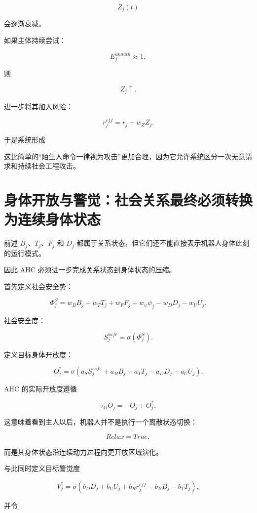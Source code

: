 \[
Z_j(t)
\]

会逐渐衰减。

如果主体持续尝试：

\[
E_j^{unauth}\approx1,
\]

则

\[
Z_j\uparrow.
\]

进一步将其加入风险：

\[
r_j^{eff}
=
r_j
+
w_ZZ_j.
\]

于是系统形成

\begin{statementbox}
\centering
{}
\end{statementbox}

这比简单的“陌生人命令一律视为攻击”更加合理，因为它允许系统区分一次无意请求和持续社会工程攻击。


\section{身体开放与警觉：社会关系最终必须转换为连续身体状态}

前述 $B_j$、$T_j$、$F_j$ 和 $D_j$ 都属于关系状态，但它们还不能直接表示机器人身体此刻的运行模式。

因此 AHC 必须进一步完成关系状态到身体状态的压缩。

首先定义社会安全势：

\[
\Phi_j^S
=
w_BB_j
+
w_TT_j
+
w_FF_j
+
w_\psi\psi_j
-
w_DD_j
-
w_UU_j.
\]

社会安全度：

\[
S_j^{safe}
=
\sigma(\Phi_j^S).
\]

定义目标身体开放度：

\[
O_j^*
=
\sigma
\left(
a_SS_j^{safe}
+
a_BB_j
+
a_TT_j
-
a_DD_j
-
a_UU_j
\right).
\]

AHC 的实际开放度遵循

\[
\boxed{
\tau_O
\dot O_j
=
-O_j
+
O_j^*.
}
\]

这意味着看到主人以后，机器人并不是执行一个离散状态切换：

\[
Relax=True,
\]

而是其身体状态沿连续动力过程向更开放区域演化。

与此同时定义目标警觉度

\[
V_j^*
=
\sigma
\left(
b_DD_j
+
b_UU_j
+
b_Rr_j^{eff}
-
b_BB_j
-
b_TT_j
\right),
\]

并令

